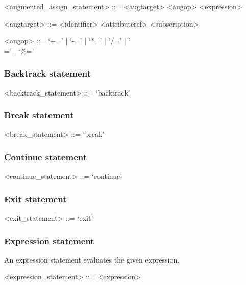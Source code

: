 \begin{grammar}
<augmented_assign_statement> ::= <augtarget> <augop> <expression>

<augtarget> ::= <identifier>
\alt <attributeref>
\alt <subscription>

<augop> ::= `+='
| `-='
| `*='
| `/='
| `\\='
| `\%='
\end{grammar}

%
\subsubsection{Backtrack statement}

\begin{grammar}
<backtrack_statement> ::= `backtrack'
\end{grammar}

%
\subsubsection{Break statement}

\begin{grammar}
<break_statement> ::= `break'
\end{grammar}

%
\subsubsection{Continue statement}

\begin{grammar}
<continue_statement> ::= `continue'
\end{grammar}

%
\subsubsection{Exit statement}

\begin{grammar}
<exit_statement> ::= `exit'
\end{grammar}

%
\subsubsection{Expression statement}

An expression statement evaluates the given expression.

\begin{grammar}
<expression_statement> ::= <expression>
\end{grammar}

